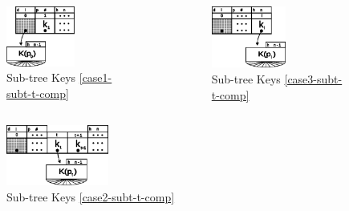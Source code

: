 \documentclass{beamer}
\begin{document}
\begin{frame}
    \begin{columns}
        \begin{column}{0.5\textwidth}
            \begin{figure}
                \centering
                \includegraphics[width=0.55\textwidth]{resources/made/keys_comp_case1.eps}
                \caption{Sub-tree Keys \eqref{case1-subt-t-comp}}
            \end{figure}
        \end{column}
        \begin{column}{0.5\textwidth}
            \begin{figure}
                \centering
                \includegraphics[width=0.55\textwidth]{resources/made/keys_comp_case3.eps}
                \caption{Sub-tree Keys \eqref{case3-subt-t-comp}}
            \end{figure}
        \end{column}
    \end{columns}
    \begin{figure}
        \centering
        \includegraphics[width=0.3\textwidth]{resources/made/keys_comp_case2.eps}
        \caption{Sub-tree Keys \eqref{case2-subt-t-comp}}
    \end{figure}
\end{frame}
\end{document}
